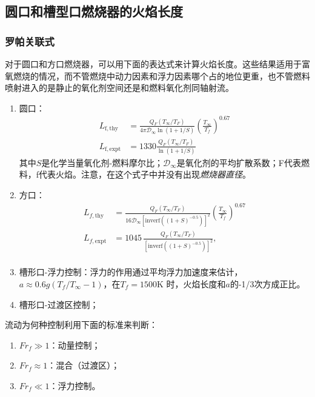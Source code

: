 \subsection{圆口和槽型口燃烧器的火焰长度}
\subsubsection{罗帕关联式}

对于圆口和方口燃烧器，可以用下面的表达式来计算火焰长度。这些结果适用于富氧燃烧的情况，而不管燃烧中动力因素和浮力因素哪个占的地位更重，也不管燃料喷射进入的是静止的氧化剂空间还是和燃料氧化剂同轴射流。

\begin{enumerate}
    \item 圆口：
    \begin{equation}
        \begin{aligned}
            L_\mathrm{f,thy} &= \frac{Q_F(T_\infty / T_F)}{4\pi \mathcal{D}_\infty \ln(1+1/S)}\left(\frac{T_\infty}{T_f}\right)^{0.67}\\
            L_\mathrm{f,expt} &= 1330\frac{Q_F (T_\infty/T_F)}{\ln(1+1/S)}
        \end{aligned}
    \end{equation}
    其中\(S\)是化学当量氧化剂-燃料摩尔比；\(\mathcal{D}_\infty\)是氧化剂的平均扩散系数；F代表燃料，f代表火焰。注意，在这个式子中并没有出现\textit{燃烧器直径}。
    \item 方口：
    \begin{equation}
        \begin{aligned}
        {L}_{f,\mathrm{thy}}&=\frac{Q_{F}(T_{\infty}/T_{F})}{16\mathcal{D}_{\infty}\left[\mathrm{inverf}((1+S)^{-0.5})\right]^{2}}\left(\frac{T_{\infty}}{T_{f}}\right)^{0.67}\\
        L_{f,\mathrm{expt}}&=1045\,{\frac{Q_{F}(T_{\infty}/T_{F})}{[\mathrm{inverf}((1+S)^{-0.5})]^{2}}},\\
        \end{aligned}
    \end{equation}
    \item 槽形口-浮力控制：浮力的作用通过平均浮力加速度来估计，\(a\approx 0.6 g(T_f/T_\infty -1)\)，在\(T_f=1500\)K 时，火焰长度和\(a\)的-1/3次方成正比。
    \item 槽形口-过渡区控制；
\end{enumerate}

流动为何种控制利用下面的标准来判断：
\begin{enumerate}
    \item \(Fr_f\gg 1\)：动量控制；
    \item \(Fr_f\approx 1\)：混合（过渡区）；
    \item \(Fr_f\ll 1\)：浮力控制。
\end{enumerate}

